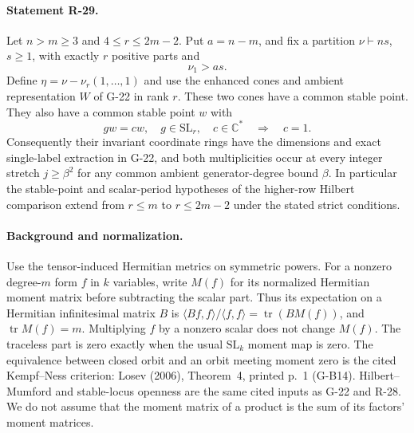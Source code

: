 \paragraph{Statement R-29.}
Let $n>m\geq3$ and $4\leq r\leq2m-2$. Put $a=n-m$,
and fix a partition $\nu\vdash ns$, $s\geq1$, with exactly
$r$ positive parts and
\[
 \nu_1>as.
\]
Define $\eta=\nu-\nu_r(1,\ldots,1)$ and use the enhanced
cones and ambient representation $W$ of G-22 in rank $r$.
These two cones have a common stable point. They also have a
common stable point $w$ with
\begin{equation}\label{R29:no_scaling}
 g w=cw,\quad g\in\mathrm{SL}_r,\quad c\in\mathbb C^*
       \quad\Longrightarrow\quad c=1.
\end{equation}
Consequently their invariant coordinate rings have the
dimensions and exact single-label extraction in G-22, and
both multiplicities occur at every integer stretch
$j\geq\beta^2$ for any common ambient generator-degree bound
$\beta$. In particular the stable-point and scalar-period
hypotheses of the higher-row Hilbert comparison extend from
$r\leq m$ to $r\leq2m-2$ under the stated strict conditions.

\paragraph{Background and normalization.}
Use the tensor-induced Hermitian metrics on symmetric powers.
For a nonzero degree-$m$ form $f$ in $k$ variables, write
$M(f)$ for its normalized Hermitian moment matrix before
subtracting the scalar part. Thus its expectation on a
Hermitian infinitesimal matrix $B$ is
$\langle Bf,f\rangle/\langle f,f\rangle
 =\operatorname{tr}(BM(f))$, and $\operatorname{tr}M(f)=m$.
Multiplying $f$ by a nonzero scalar does not change $M(f)$.
The traceless part is zero exactly when the usual
$\mathrm{SL}_k$ moment map is zero. The equivalence between
closed orbit and an orbit meeting moment zero is the cited
Kempf--Ness criterion: Losev (2006), Theorem~4, printed p.~1
(G-B14). Hilbert--Mumford and stable-locus openness are the
same cited inputs as G-22 and R-28. We do not assume that
the moment matrix of a product is the sum of its factors'
moment matrices.

